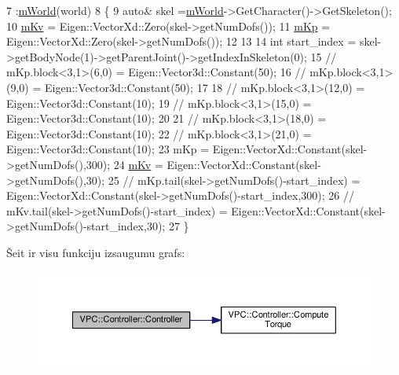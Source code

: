 \begin{DoxyCode}
7     :\hyperlink{class_v_p_c_1_1_controller_a9c46fee9b19ef4f4d79726717f923586}{mWorld}(world)
8 \{
9     \textcolor{keyword}{auto}& skel =\hyperlink{class_v_p_c_1_1_controller_a9c46fee9b19ef4f4d79726717f923586}{mWorld}->GetCharacter()->GetSkeleton();
10     \hyperlink{class_v_p_c_1_1_controller_a6c4a4f388d7ee81f2519e4b05f653f9d}{mKv} = Eigen::VectorXd::Zero(skel->getNumDofs());
11     \hyperlink{class_v_p_c_1_1_controller_a88da6e3301abaeb5b63fd1519fb67cb1}{mKp} = Eigen::VectorXd::Zero(skel->getNumDofs());
12 
13 
14     \textcolor{keywordtype}{int} start\_index = skel->getBodyNode(1)->getParentJoint()->getIndexInSkeleton(0);
15     \textcolor{comment}{// mKp.block<3,1>(6,0) = Eigen::Vector3d::Constant(50);}
16     \textcolor{comment}{// mKp.block<3,1>(9,0) = Eigen::Vector3d::Constant(50);}
17 
18     \textcolor{comment}{// mKp.block<3,1>(12,0) = Eigen::Vector3d::Constant(10);}
19     \textcolor{comment}{// mKp.block<3,1>(15,0) = Eigen::Vector3d::Constant(10);}
20 
21     \textcolor{comment}{// mKp.block<3,1>(18,0) = Eigen::Vector3d::Constant(10);}
22     \textcolor{comment}{// mKp.block<3,1>(21,0) = Eigen::Vector3d::Constant(10);}
23     mKp = Eigen::VectorXd::Constant(skel->getNumDofs(),300);
24     \hyperlink{class_v_p_c_1_1_controller_a6c4a4f388d7ee81f2519e4b05f653f9d}{mKv} = Eigen::VectorXd::Constant(skel->getNumDofs(),30);
25     \textcolor{comment}{// mKp.tail(skel->getNumDofs()-start\_index) =
       Eigen::VectorXd::Constant(skel->getNumDofs()-start\_index,300);}
26     \textcolor{comment}{// mKv.tail(skel->getNumDofs()-start\_index) =
       Eigen::VectorXd::Constant(skel->getNumDofs()-start\_index,30);}
27 \}
\end{DoxyCode}


Šeit ir visu funkciju izsaugumu grafs\+:
\nopagebreak
\begin{figure}[H]
\begin{center}
\leavevmode
\includegraphics[width=350pt]{class_v_p_c_1_1_controller_a132b5d8ac47550346fecf84fe8008179_cgraph}
\end{center}
\end{figure}




